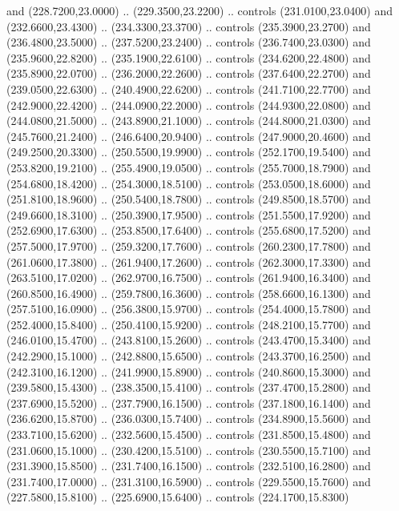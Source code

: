{\begin{scope}[y=0.80pt, x=0.80pt, yscale=-1, xscale=1, inner sep=0pt, outer sep=0pt, #1]
      and (228.7200,23.0000) .. (229.3500,23.2200) .. controls (231.0100,23.0400)
      and (232.6600,23.4300) .. (234.3300,23.3700) .. controls (235.3900,23.2700)
      and (236.4800,23.5000) .. (237.5200,23.2400) .. controls (236.7400,23.0300)
      and (235.9600,22.8200) .. (235.1900,22.6100) .. controls (234.6200,22.4800)
      and (235.8900,22.0700) .. (236.2000,22.2600) .. controls (237.6400,22.2700)
      and (239.0500,22.6300) .. (240.4900,22.6200) .. controls (241.7100,22.7700)
      and (242.9000,22.4200) .. (244.0900,22.2000) .. controls (244.9300,22.0800)
      and (244.0800,21.5000) .. (243.8900,21.1000) .. controls (244.8000,21.0300)
      and (245.7600,21.2400) .. (246.6400,20.9400) .. controls (247.9000,20.4600)
      and (249.2500,20.3300) .. (250.5500,19.9900) .. controls (252.1700,19.5400)
      and (253.8200,19.2100) .. (255.4900,19.0500) .. controls (255.7000,18.7900)
      and (254.6800,18.4200) .. (254.3000,18.5100) .. controls (253.0500,18.6000)
      and (251.8100,18.9600) .. (250.5400,18.7800) .. controls (249.8500,18.5700)
      and (249.6600,18.3100) .. (250.3900,17.9500) .. controls (251.5500,17.9200)
      and (252.6900,17.6300) .. (253.8500,17.6400) .. controls (255.6800,17.5200)
      and (257.5000,17.9700) .. (259.3200,17.7600) .. controls (260.2300,17.7800)
      and (261.0600,17.3800) .. (261.9400,17.2600) .. controls (262.3000,17.3300)
      and (263.5100,17.0200) .. (262.9700,16.7500) .. controls (261.9400,16.3400)
      and (260.8500,16.4900) .. (259.7800,16.3600) .. controls (258.6600,16.1300)
      and (257.5100,16.0900) .. (256.3800,15.9700) .. controls (254.4000,15.7800)
      and (252.4000,15.8400) .. (250.4100,15.9200) .. controls (248.2100,15.7700)
      and (246.0100,15.4700) .. (243.8100,15.2600) .. controls (243.4700,15.3400)
      and (242.2900,15.1000) .. (242.8800,15.6500) .. controls (243.3700,16.2500)
      and (242.3100,16.1200) .. (241.9900,15.8900) .. controls (240.8600,15.3000)
      and (239.5800,15.4300) .. (238.3500,15.4100) .. controls (237.4700,15.2800)
      and (237.6900,15.5200) .. (237.7900,16.1500) .. controls (237.1800,16.1400)
      and (236.6200,15.8700) .. (236.0300,15.7400) .. controls (234.8900,15.5600)
      and (233.7100,15.6200) .. (232.5600,15.4500) .. controls (231.8500,15.4800)
      and (231.0600,15.1000) .. (230.4200,15.5100) .. controls (230.5500,15.7100)
      and (231.3900,15.8500) .. (231.7400,16.1500) .. controls (232.5100,16.2800)
      and (231.7400,17.0000) .. (231.3100,16.5900) .. controls (229.5500,15.7600)
      and (227.5800,15.8100) .. (225.6900,15.6400) .. controls (224.1700,15.8300)

\end{scope}}
